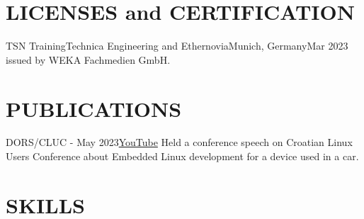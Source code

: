 \documentclass[10pt, a4paper]{article}
\begin{document}
%
%

\section{LICENSES and CERTIFICATION}

\begin{cvitem}{TSN Training}{Technica Engineering and Ethernovia}{Munich, Germany}{Mar 2023}
    issued by WEKA Fachmedien GmbH.
\end{cvitem}

\section{PUBLICATIONS}


\begin{projitem}{DORS/CLUC - May 2023}{\href{https://youtu.be/HTWr7Owovx8?si=T6Tf8IGvjVxLS3Mo}{YouTube}}
    Held a conference speech on Croatian Linux Users Conference about Embedded Linux development for a device used in a car.
\end{projitem}

\section{SKILLS}
\end{document}
